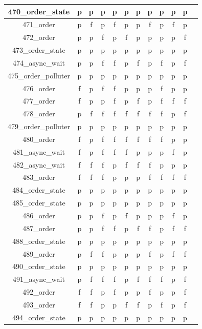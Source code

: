 \documentclass[
fancyheadings, %
%
%
]{stsreprt}
\begin{document}
\begin{longtable}{|c|c|c|c|c|c|c|c|c|c|c|c|}
\hline
470\_order\_state & p & p & p & p & p & p & p & p & p & p \\
\hline
471\_order & p & f & p & f & p & p & f & p & f & p \\
\hline
472\_order & p & p & f & p & f & p & p & p & p & f \\
\hline
473\_order\_state & p & p & p & p & p & p & p & p & p & p \\
\hline
474\_async\_wait & p & p & f & f & p & f & p & f & p & f \\
\hline
475\_order\_polluter & p & p & p & p & p & p & p & p & p & p \\
\hline
476\_order & f & p & f & f & p & p & p & f & p & p \\
\hline
477\_order & f & p & p & f & p & f & p & f & f & f \\
\hline
478\_order & p & f & f & f & f & f & f & f & p & f \\
\hline
479\_order\_polluter & p & p & p & p & p & p & p & p & p & p \\
\hline
480\_order & f & p & f & f & f & f & f & f & p & p \\
\hline
481\_async\_wait & f & p & f & f & f & p & p & p & f & p \\
\hline
482\_async\_wait & f & f & f & p & f & f & f & p & p & p \\
\hline
483\_order & f & f & f & p & p & p & f & f & f & f \\
\hline
484\_order\_state & p & p & p & p & p & p & p & p & p & p \\
\hline
485\_order\_state & p & p & p & p & p & p & p & p & p & p \\
\hline
486\_order & p & p & f & p & f & p & p & p & f & p \\
\hline
487\_order & p & p & f & f & p & f & f & p & f & f \\
\hline
488\_order\_state & p & p & p & p & p & p & p & p & p & p \\
\hline
489\_order & p & f & f & p & p & p & f & p & f & f \\
\hline
490\_order\_state & p & p & p & p & p & p & p & p & p & p \\
\hline
491\_async\_wait & p & f & f & f & p & f & f & f & p & f \\
\hline
492\_order & f & f & p & f & p & p & f & p & p & f \\
\hline
493\_order & f & f & p & p & f & f & p & f & p & f \\
\hline
494\_order\_state & p & p & p & p & p & p & p & p & p & p \\

\end{longtable}
\end{document}
